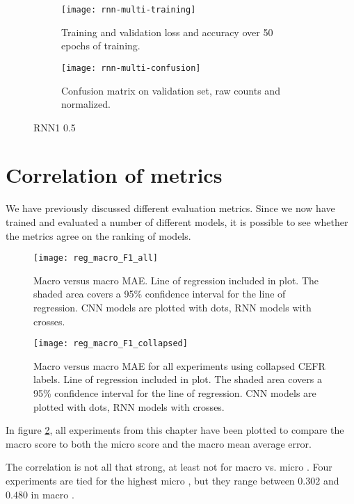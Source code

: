 \begin{figure}
  \begin{subfigure}{\linewidth}
    \centering
    \texttt{[image: rnn-multi-training]}
    \caption{Training and validation loss and accuracy over 50 epochs of training.}
  \end{subfigure}
  \begin{subfigure}{\linewidth}
    \centering
    \texttt{[image: rnn-multi-confusion]}
    \caption{Confusion matrix on validation set, raw counts and normalized.}
  \end{subfigure}
  \caption{RNN1 0.5}
  \label{fig:rnn-multi-training}
\end{figure}


\section{Correlation of metrics}


We have previously discussed different evaluation metrics. Since we now have
trained and evaluated a number of different models, it is possible to see
whether the metrics agree on the ranking of models.

\begin{figure}
  \centering
  \texttt{[image: reg\_macro\_F1\_all]}
  \caption[Macro \FI versus macro MAE]{
    Macro \FI versus macro MAE. Line of regression included in plot. The shaded
    area covers a 95\% confidence interval for the line of regression. CNN
    models are plotted with dots, RNN models with crosses.
  }
  \label{fig:reg_macro_F1_all}
\end{figure}

\begin{figure}
  \centering
  \texttt{[image: reg\_macro\_F1\_collapsed]}
  \caption[Macro \FI versus macro MAE]{
    Macro \FI versus macro MAE for all experiments using collapsed CEFR labels.
    Line of regression included in plot. The shaded area covers a 95\%
    confidence interval for the line of regression. CNN models are plotted with
    dots, RNN models with crosses.
  }
  \label{fig:reg_macro_F1_collapsed}
\end{figure}

In figure \ref{fig:reg_macro_F1_all}, all experiments from this chapter have
been plotted to compare the macro \FI score to both the micro \FI score and
the macro mean average error.

The correlation is not all that strong, at least not for macro \FI vs. micro
\FI. Four experiments are tied for the highest micro \FI, but they range
between $0.302$ and $0.480$ in macro \FI.

